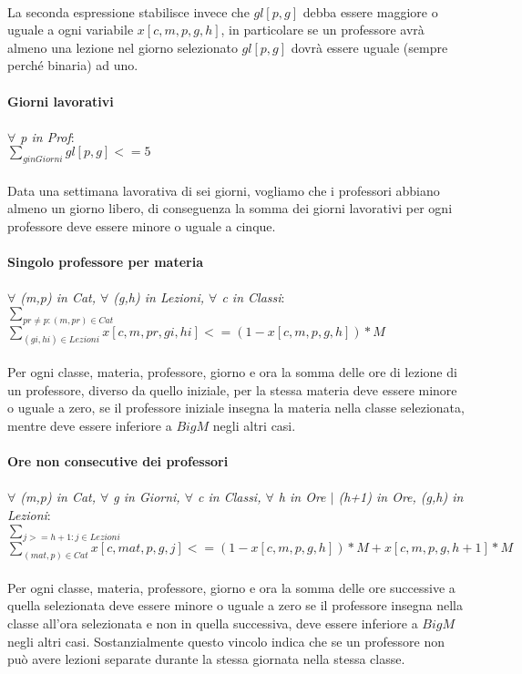 \documentclass{article}
\begin{document}
\\La seconda espressione stabilisce invece che $gl[p,g]$ debba essere maggiore o uguale a ogni variabile $x[c,m,p,g,h]$, in particolare se un professore avrà almeno una lezione nel giorno selezionato $gl[p,g]$ dovrà essere uguale (sempre perché binaria) ad uno.
\\\\\textbf{Giorni lavorativi}
	\\\\\emph{$\forall$ p in Prof}:
	\\$\sum_{g in Giorni}gl[p,g] <= 5$
\\\\Data una settimana lavorativa di sei giorni, vogliamo che i professori abbiano almeno un giorno libero, di conseguenza la somma dei giorni lavorativi per ogni professore deve essere minore o uguale a cinque.
\\\\\textbf{Singolo professore per materia}
	\\\\\emph{$\forall$ (m,p) in Cat, $\forall$ (g,h) in Lezioni, $\forall$ c in Classi}:
	\\$\sum_{pr \neq p : (m,pr) \in Cat}$ $\sum_{(gi,hi) \in Lezioni}x[c,m,pr,gi,hi] <= (1-x[c,m,p,g,h])*M$
\\\\Per ogni classe, materia, professore, giorno e ora la somma delle ore di lezione di un professore, diverso da quello iniziale, per la stessa materia deve essere minore o uguale a zero, se il professore iniziale insegna la materia nella classe selezionata, mentre deve essere inferiore a $Big M$ negli altri casi.
\\\\\textbf{Ore non consecutive dei professori}
	\\\\\emph{$\forall$ (m,p) in Cat, $\forall$ g in Giorni, $\forall$ c in Classi, $\forall$ h in Ore $\mid$ (h+1) in Ore, (g,h) in Lezioni}:
	\\$\sum_{j>=h+1: j \in Lezioni}$ $\sum_{(mat,p) \in Cat}x[c,mat,p,g,j] <= (1-x[c,m,p,g,h])*M + x[c,m,p,g,h+1]*M$
\\\\Per ogni classe, materia, professore, giorno e ora la somma delle ore successive a quella selezionata deve essere minore o uguale a zero se il professore insegna nella classe all'ora selezionata e non in quella successiva, deve essere inferiore a $Big M$ negli altri casi. Sostanzialmente questo vincolo indica che se un professore non può avere lezioni separate durante la stessa giornata nella stessa classe.
\end{document}
